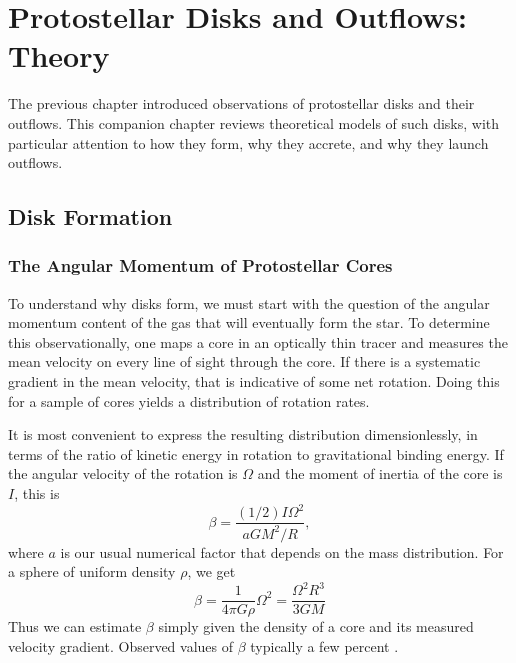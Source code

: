 \chapter{Protostellar Disks and Outflows: Theory}
\label{ch:disks_theory}


The previous chapter introduced observations of protostellar disks and their outflows. This companion chapter reviews theoretical models of such disks, with particular attention to how they form, why they accrete, and why they launch outflows.

\section{Disk Formation}

\subsection{The Angular Momentum of Protostellar Cores}

To understand why disks form, we must start with the question of the angular momentum content of the gas that will eventually form the star. To determine this observationally, one maps a core in an optically thin tracer and measures the mean velocity on every line of sight through the core. If there is a systematic gradient in the mean velocity, that is indicative of some net rotation. Doing this for a sample of cores yields a distribution of rotation rates.

It is most convenient to express the resulting distribution dimensionlessly, in terms of the ratio of kinetic energy in rotation to gravitational binding energy. If the angular velocity of the rotation is $\Omega$ and the moment of inertia of the core is $I$, this is
\begin{equation}
\beta = \frac{(1/2)I\Omega^2}{a G M^2/R},
\end{equation}
where $a$ is our usual numerical factor that depends on the mass distribution. For a sphere of uniform density $\rho$, we get
\begin{equation}
\beta = \frac{1}{4\pi G \rho}\Omega^2 = \frac{\Omega^2 R^3}{3 G M}
\end{equation}
Thus we can estimate $\beta$ simply given the density of a core and its measured velocity gradient. Observed values of $\beta$ typically a few percent \citep[e.g.,][]{goodman93a}.

